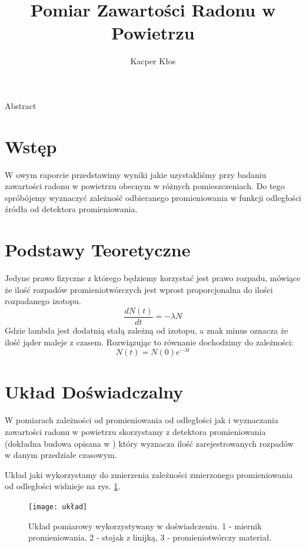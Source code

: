 \documentclass[12pt]{article}
\title{Pomiar Zawartości Radonu w Powietrzu}
\author{Kacper Kłos}
\begin{document}
\maketitle

Abstract

\newpage
\section{Wstęp}
W owym raporcie przedstawimy wyniki jakie uzystakliśmy przy badaniu zawartości radonu w powietrzu obecnym w różnych pomieszczeniach. Do tego spróbójemy wyznaczyć zależność odbieranego promieniowania w funkcji odległości źródła od detektora promieniowania.

\section{Podstawy Teoretyczne}
Jedyne prawo fizyczne z którego będziemy korzystać jest prawo rozpadu, mówiące że ilość rozpadów promieniotwórczych jest wprost proporcjonalna do ilości rozpadanego izotopu.
\[
	\frac{dN(t)}{dt} = - \lambda N
\]
Gdzie lambda jest dodatnią stałą zależną od izotopu, a znak minus oznacza że ilość jąder maleje z czasem. Rozwiązując to równanie dochodzimy do zależności:
\begin{equation}
	N(t) = N(0) e^{-\lambda t}
	\label{eq:decay}
\end{equation}


\section{Układ Doświadczalny}

W pomiarach zależności od promieniowania od odległości jak i wyznaczania zawartości radonu w powietrzu skorzystamy z detektora promieniowania (dokładna budowa opisana w \cite{skrypt}) który wyznacza ilość zarejestrowanych rozpadów w danym przedziale czasowym.

Układ jaki wykorzystamy do zmierzenia zależności zmierzonego promieniowania od odległości widnieje na rys. \ref{fig:diagram}.
\begin{figure}[H]
	\centering
	\texttt{[image: układ]}
	\label{fig:diagram}
	\caption{Układ pomiarowy wykorzystywany w doświadczeniu. 1 - miernik promieniowania, 2 - stojak z linijką, 3 - promieniotwórczy materiał.}
\end{figure}
\end{document}
